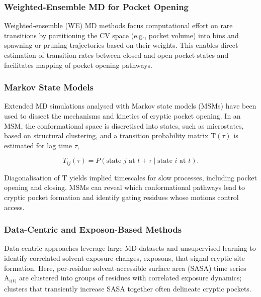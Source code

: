 \documentclass[12pt]{article}
\begin{document}
\subsubsection{Weighted-Ensemble MD for Pocket Opening}

Weighted-ensemble (WE) MD\cite{CH5_zuckerman2017weighted} methods focus computational effort on rare transitions by partitioning the CV space (e.g., pocket volume) into bins and spawning or pruning trajectories based on their weights. This enables direct estimation of transition rates between closed and open pocket states and facilitates mapping of pocket opening pathways.

\subsubsection{Markov State Models}

Extended MD simulations analysed with Markov state models (MSMs)\cite{CH5_husic2018markov} have been used to dissect the mechanisms and kinetics of cryptic pocket opening. In an MSM, the conformational space is discretised into states, such as microstates, based on structural clustering, and a transition probability matrix $\textrm{T}(\tau)$ is estimated for lag time $\tau$,

\begin{equation}
T_{ij}(\tau) = P(\text{state } j \text{ at } t + \tau \mid \text{state } i \text{ at } t).
\label{eq:msm}
\end{equation}

Diagonalisation of $\textrm{T}$ yields implied timescales for slow processes, including pocket opening and closing. MSMs can reveal which conformational pathways lead to cryptic pocket formation and identify gating residues whose motions control access\cite{CH5_Kuzmanic2020}.

\subsubsection{Data-Centric and Exposon-Based Methods}

Data-centric approaches leverage large MD datasets and unsupervised learning to identify correlated solvent exposure changes, exposons, that signal cryptic site formation\cite{CH5_amaro2019will}. Here, per-residue solvent-accessible surface area (SASA) time series $\textrm{A}_\textrm{i(t)}$ are clustered into groups of residues with correlated exposure dynamics; clusters that transiently increase SASA together often delineate cryptic pockets.
\end{document}

